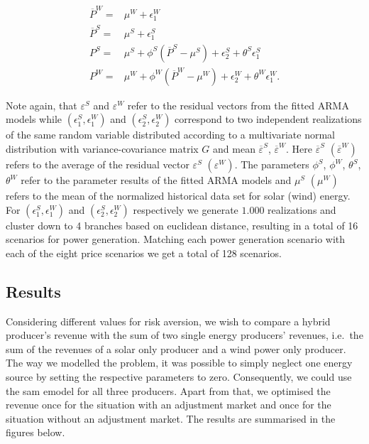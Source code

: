\begin{align}
\overline{P}^{W}=& \mu^W+\epsilon_1^W\\
\overline{P}^{S}=& \mu^S+\epsilon_1^S\\
{P}^{S}=&\mu^S + \phi^S \left(\overline{P}^{S}-\mu^S\right)+\epsilon^S_2 + \theta^S\epsilon^S_1\\
{P}^{W}=&\mu^W + \phi^W \left(\overline{P}^{W}-\mu^W\right)+\epsilon^W_2 + \theta^W\epsilon^W_1.
\end{align}
 

Note again, that $\varepsilon^S$ and $\varepsilon^W$ refer to the residual vectors from the fitted ARMA models while $\left(\epsilon_1^S,\epsilon_1^W\right)$ and $\left(\epsilon_2^S,\epsilon_2^W\right)$ correspond to two independent realizations of the same random variable distributed according to a multivariate normal distribution with variance-covariance matrix $G$ and mean $\overline{\varepsilon}^S$, $\overline{\varepsilon}^W$. Here $\overline{\varepsilon}^S$ $\left(\overline{\varepsilon}^W\right)$ refers to the average of the residual vector $\varepsilon^S$ $\left(\varepsilon^W\right)$. The parameters $\phi^S$, $\phi^W$, $\theta^S$, $\theta^W$ refer to the parameter results of the fitted ARMA models and $\mu^S$ $\left(\mu^W\right)$ refers to the mean of the normalized historical data set for solar (wind) energy. For $\left(\epsilon_1^S,\epsilon_1^W\right)$ and $\left(\epsilon_2^S,\epsilon_2^W\right)$ respectively we generate $1.000$ realizations and cluster down to 4 branches based on euclidean distance, resulting in a total of 16 scenarios for power generation. Matching each power generation scenario with each of the eight price scenarios we get a total of 128 scenarios.



\subsection{Results}
Considering different values for risk aversion, we wish to compare a hybrid producer's revenue with the sum of two single energy producers' revenues, i.e.\ the sum of the revenues of a solar only producer and a wind power only producer. The way we modelled the problem, it was possible to simply neglect one energy source by setting the respective parameters to zero. Consequently, we could use the sam emodel for all three producers. Apart from that, we optimised the revenue once for the situation with an adjustment market and once for the situation without an adjustment market. The results are summarised in the figures below.  

